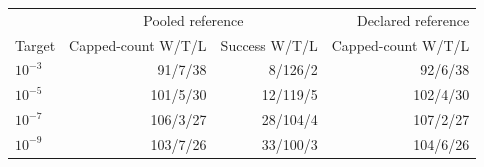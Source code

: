 \begin{tabular}{lrrr}
\toprule
& \multicolumn{2}{c}{Pooled reference} & Declared reference \\
Target & Capped-count W/T/L & Success W/T/L & Capped-count W/T/L \\
\midrule
$10^{-3}$ & 91/7/38 & 8/126/2 & 92/6/38 \\
$10^{-5}$ & 101/5/30 & 12/119/5 & 102/4/30 \\
$10^{-7}$ & 106/3/27 & 28/104/4 & 107/2/27 \\
$10^{-9}$ & 103/7/26 & 33/100/3 & 104/6/26 \\
\bottomrule
\end{tabular}
